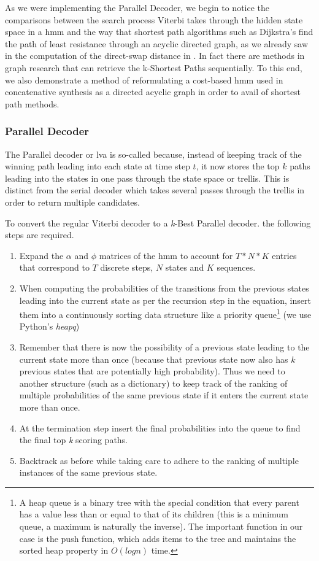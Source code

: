 {{{{{{{{As we were implementing the Parallel Decoder, we begin to notice the comparisons between the search process Viterbi takes through the hidden state space in a \acrshort{hmm} and the way that shortest path algorithms such as Dijkstra's find the path of least resistance through an acyclic directed graph, as we already saw in the computation of the direct-swap distance in . In fact there are methods in graph research that can retrieve the k-Shortest Paths sequentially. To this end, we also demonstrate a method of reformulating a cost-based \acrshort{hmm} used in concatenative synthesis as a directed acyclic graph in order to avail of shortest path methods.

\subsubsection{Parallel Decoder}

The Parallel decoder \citep{Seshadri1994} or \acrfull{lva} is so-called because, instead of keeping track of the winning path leading into each state at time step $t$, it now stores the top $k$ paths leading into the states in one pass through the state space or trellis. This is distinct from the serial decoder which takes several passes through the trellis in order to return multiple candidates.

To convert the regular Viterbi decoder to a \textit{k}-Best Parallel decoder. the following steps are required.

\begin{enumerate}
  \item Expand the $\alpha$ and $\phi$ matrices of the \acrshort{hmm} to account for $T*N*K$ entries that correspond to $T$ discrete steps, $N$ states and $K$ sequences.
  \item When computing the probabilities of the transitions from the previous states leading into the current state as per the recursion step in the equation, insert them into a continuously sorting data structure like a priority queue\footnote{ A heap queue is a binary tree with the special condition that every parent has a value less than or equal to that of its children (this is a minimum queue, a maximum is naturally the inverse). The important function in our case is the push function, which adds items to the tree and maintains the sorted heap property in $O(log n)$ time. } (we use Python's \textit{heapq})
  \item Remember that there is now the possibility of a previous state leading to the current state more than once (because that previous state now also has $k$ previous states that are potentially high probability). Thus we need to another structure (such as a dictionary) to keep track of the ranking of multiple probabilities of the same previous state if it enters the current state more than once.
  \item At the termination step insert the final probabilities into the queue to find the final top \textit{k} scoring paths.
  \item Backtrack as before while taking care to adhere to the ranking of multiple instances of the same previous state.
\end{enumerate}

}}}}}}}}
